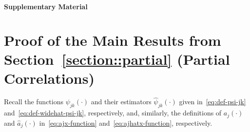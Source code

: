 \documentclass{article}
\begin{document}
 
 
 
 \newpage
 \begin{appendices}
 \begin{center}{\Large{\bf Supplementary Material}}
 \end{center}
 
 \section{Proof of the Main Results from Section~\ref{section::partial} (Partial Correlations)}
 \label{appendix:main.partial} 
 
 
 Recall the functions $\psi_{jk}(\cdot)$ and their estimators $\widehat{\psi}_{jk}(\cdot)$ given in~\eqref{eq:def-psi-jk} and~\eqref{eq:def-widehat-psi-jk}, respectively, and, similarly, the definitions of $a_j(\cdot)$ and $\widehat{a}_j(\cdot)$  in~\eqref{eq:ajx-function} and~\eqref{eq:ajhatx-function}, respectively.
 

\end{appendices}
\end{document}

